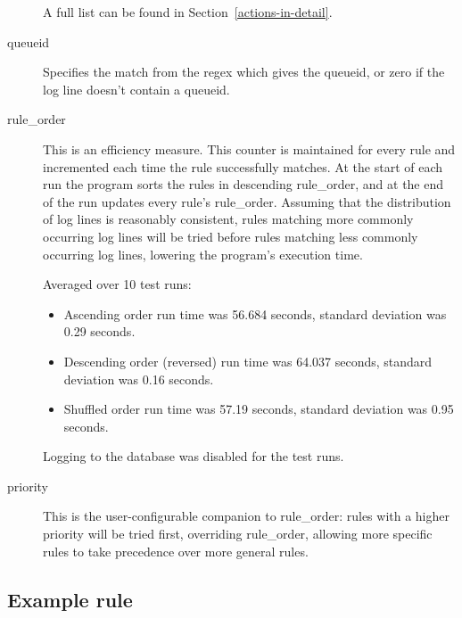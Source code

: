 \documentclass[a4paper,12pt,draft]{article}
\begin{document}
\begin{description}
\begin{description}
        \end{description}

        A full list can be found in Section~\ref{actions-in-detail}.

    \item [queueid] Specifies the match from the regex which gives the
        queueid, or zero if the log line doesn't contain a queueid.

    \item [rule\_order] This is an efficiency measure.  This counter is
        maintained for every rule and incremented each time the rule
        successfully matches.  At the start of each run the program sorts
        the rules in descending rule\_order, and at the end of the run
        updates every rule's rule\_order.  Assuming that the distribution
        of log lines is reasonably consistent, rules matching more commonly
        occurring log lines will be tried before rules matching less
        commonly occurring log lines, lowering the program's execution
        time.

        Averaged over 10 test runs:

        \begin{itemize} 

            \item Ascending order run time was 56.684 seconds, standard
                deviation was 0.29 seconds.

            \item Descending order (reversed) run time was 64.037 seconds,
                standard deviation was 0.16 seconds.

            \item Shuffled order run time was 57.19 seconds, standard
                deviation was 0.95 seconds.

        \end{itemize}

        Logging to the database was disabled for the test runs.

    \item [priority] This is the user-configurable companion to
        rule\_order: rules with a higher priority will be tried first,
        overriding rule\_order, allowing more specific rules to take
        precedence over more general rules.

\end{description}


\subsection{Example rule}
\end{document}
